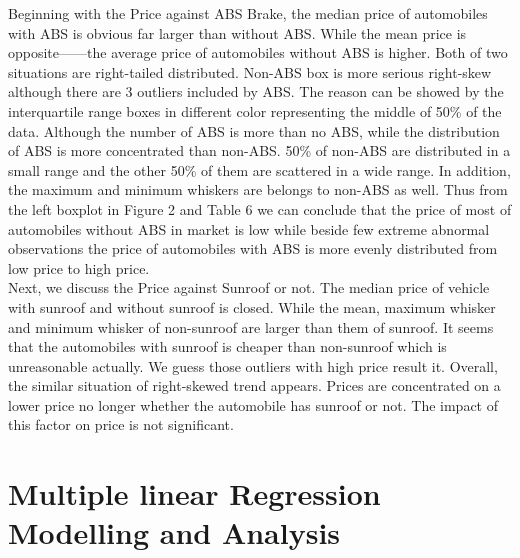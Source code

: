 \documentclass[a4paper]{article}
\begin{document}
\noindent
Beginning with the Price against ABS Brake, the median price of automobiles with ABS is obvious far larger than without ABS. While the mean price is opposite——the average price of automobiles without ABS is higher. Both of two situations are right-tailed distributed. Non-ABS box is more serious right-skew although there are 3 outliers included by ABS. The reason can be showed by the interquartile range boxes in different color representing the middle of 50\% of the data. Although the number of ABS is more than no ABS, while the distribution of ABS is more concentrated than non-ABS. 50\% of non-ABS are distributed in a small range and the other 50\% of them are scattered in a wide range. In addition, the maximum and minimum whiskers are belongs to non-ABS as well. Thus from the left boxplot in Figure 2 and Table 6 we can conclude that the price of most of automobiles without ABS in market is low while beside few extreme abnormal observations the price of automobiles with ABS is more evenly distributed from low price to high price. \\

\noindent
Next, we discuss the Price against Sunroof or not. The median price of vehicle with sunroof and without sunroof is closed. While the mean, maximum whisker and minimum whisker of non-sunroof are larger than them of sunroof. It seems that the automobiles with sunroof is cheaper than non-sunroof which is unreasonable actually. We guess those outliers with high                                                                                                                                                                                                                                                                                                                                                                                                        price result it. Overall, the similar situation of right-skewed trend appears. Prices are concentrated on a lower price no longer whether the automobile has sunroof or not. The impact of this factor on price is not significant.












\section{Multiple linear Regression Modelling and Analysis}
\end{document}
